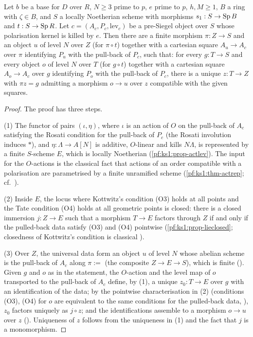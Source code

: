 \begin{proposition}\label{pf:ks1:prop-relrep}
Let $b$ be a base for $D$ over $R$, $N\ge3$ prime to $p$, $e$ prime to $p$, $h,M\ge1$, $B$ a ring with
$\zeta\in B$, and $S$ a locally Noetherian scheme with morphisms $s_1:S\to\operatorname{Sp} B$ and $t:S\to\operatorname{Sp} R$.
Let $c=(A_c,P_c,\mathrm{lev}_c)$ be a pre-Siegel object over $S$ whose polarisation kernel is killed by $e$.
Then there are a finite morphism $\pi:Z\to S$ and an object $u$ of level $N$ over $Z$ (for $\pi\circ t$)
together with a cartesian square $A_u\to A_c$ over $\pi$ identifying $P_u$ with the pull-back of $P_c$, such
that: for every $g:T\to S$ and every object $o$ of level $N$ over $T$ (for $g\circ t$) together with a
cartesian square $A_o\to A_c$ over $g$ identifying $P_o$ with the pull-back of $P_c$, there is a unique
$z:T\to Z$ with $\pi z=g$ admitting a morphism $o\to u$ over $z$ compatible with the given squares.
\end{proposition}

\begin{proof}
The proof has three steps.

(1) The functor of pairs $(\iota,\eta)$, where $\iota$ is an action of $O$ on the pull-back of $A_c$ satisfying the
Rosati condition for the pull-back of $P_c$ (the Rosati involution induces $*$), and $\eta:\Lambda\to A[N]$ is additive,
$O$-linear and kills $N\Lambda$, is represented by a finite $S$-scheme $E$, which is locally Noetherian
(\cref{pf:ks1:prop-actlev}). The input for the $O$-actions is the classical fact that actions of an order compatible
with a polarisation are parametrised by a finite unramified scheme (\cref{pf:ks1:thm-actrep}; cf.\ \cite[\S5]{Kottwitz1992}).

(2) Inside $E$, the locus where Kottwitz's condition (O3) holds at all points and the Tate condition (O4) holds
at all geometric points is closed: there is a closed immersion $j:Z\to E$ such that a morphism $T\to E$ factors
through $Z$ if and only if the pulled-back data satisfy (O3) and (O4) pointwise
(\cref{pf:ks1:prop-lieclosed}; closedness of Kottwitz's condition is classical \cite[\S5]{Kottwitz1992}).

(3) Over $Z$, the universal data form an object $u$ of level $N$ whose abelian scheme is the pull-back of
$A_c$ along $\pi:=$ (the composite $Z\to E\to S$), which is finite
(). Given $g$ and $o$ as in the
statement, the $O$-action and the level map of $o$ transported to the pull-back of $A_c$ define, by (1), a
unique $z_0:T\to E$ over $g$ with an identification of the data; by the pointwise characterisation in (2)
(conditions (O3), (O4) for $o$ are equivalent to the same conditions for the pulled-back data,
), $z_0$ factors uniquely as $j\circ z$; and
the identifications assemble to a morphism $o\to u$ over $z$
(). Uniqueness of $z$ follows from the
uniqueness in (1) and the fact that $j$ is a monomorphism.
\end{proof}

